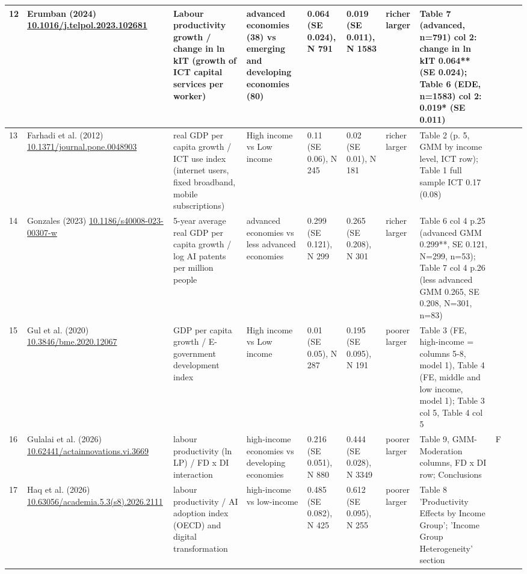 \documentclass[10pt,a4paper]{article}
\begin{document}
\begin{longtable}{@{}p{0.4cm}p{2.4cm}p{2.6cm}p{3.0cm}p{2.6cm}p{2.6cm}p{1.5cm}p{5.6cm}p{0.3cm}p{1.0cm}p{1.6cm}@{}}
12 & Erumban (2024) \newline \url{10.1016/j.telpol.2023.102681} & Labour productivity growth / change in ln kIT (growth of ICT capital services per worker) & advanced economies (38) vs emerging and developing economies (80) & 0.064 (SE 0.024), N 791 & 0.019 (SE 0.011), N 1583 & richer larger & Table 7 (advanced, n=791) col 2: change in ln kIT 0.064** (SE 0.024); Table 6 (EDE, n=1583) col 2: 0.019* (SE 0.011) &  &  &  \\ \midrule
13 & Farhadi et al. (2012) \newline \url{10.1371/journal.pone.0048903} & real GDP per capita growth / ICT use index (internet users, fixed broadband, mobile subscriptions) & High income vs Low income & 0.11 (SE 0.06), N 245 & 0.02 (SE 0.01), N 181 & richer larger & Table 2 (p. 5, GMM by income level, ICT row); Table 1 full sample ICT 0.17 (0.08) &  &  &  \\ \midrule
14 & Gonzales (2023) \newline \url{10.1186/s40008-023-00307-w} & 5-year average real GDP per capita growth / log AI patents per million people & advanced economies vs less advanced economies & 0.299 (SE 0.121), N 299 & 0.265 (SE 0.208), N 301 & richer larger & Table 6 col 4 p.25 (advanced GMM 0.299**, SE 0.121, N=299, n=53); Table 7 col 4 p.26 (less advanced GMM 0.265, SE 0.208, N=301, n=83) &  &  &  \\ \midrule
15 & Gul et al. (2020) \newline \url{10.3846/bme.2020.12067} & GDP per capita growth / E-government development index & High income vs Low income & 0.01 (SE 0.05), N 287 & 0.195 (SE 0.095), N 191 & poorer larger & Table 3 (FE, high-income = columns 5-8, model 1), Table 4 (FE, middle and low income, model 1); Table 3 col 5, Table 4 col 5 &  &  &  \\ \midrule
16 & Gulalai et al. (2026) \newline \url{10.62441/actainnovations.vi.3669} & labour productivity (ln LP) / FD x DI interaction & high-income economies vs developing economies & 0.216 (SE 0.051), N 880 & 0.444 (SE 0.028), N 3349 & poorer larger & Table 9, GMM-Moderation columns, FD x DI row; Conclusions & F &  &  \\ \midrule
17 & Haq et al. (2026) \newline \url{10.63056/academia.5.3(s8).2026.2111} & labour productivity / AI adoption index (OECD) and digital transformation & high-income vs low-income & 0.485 (SE 0.082), N 425 & 0.612 (SE 0.095), N 255 & poorer larger & Table 8 'Productivity Effects by Income Group'; 'Income Group Heterogeneity' section &  &  &  \\ \midrule

\end{longtable}
\end{document}
